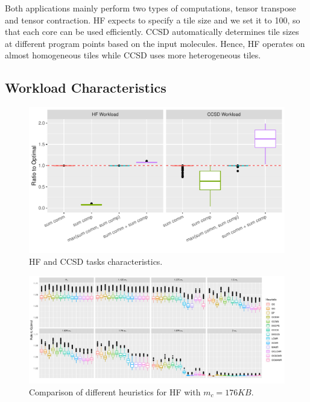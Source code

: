 \documentclass[sigconf]{acmart}
\begin{document}
{		%
		Both applications mainly perform two types of computations, tensor transpose and tensor contraction. HF expects to specify a tile size and we set it to 100, so that each core can be used efficiently. CCSD automatically determines tile sizes at different program points based on the input molecules. Hence, HF operates on almost homogeneous tiles while CCSD uses more heterogeneous tiles.
		
		\subsection{Workload Characteristics}
		\begin{figure}[htb]
			\vspace*{-0.3cm}
			\begin{center}
				\includegraphics[scale=0.48]{./results/application_properties.pdf}
				\vspace*{-0.9cm}\caption{HF and CCSD tasks characteristics.\vspace*{-0.35cm}}
				\label{fig:ApplicationProperties}
			\end{center}
		\end{figure}
			\begin{figure}[!t]
			\includegraphics[scale=0.5]{./results/ratio_to_optimal_selected_hf.pdf}
			\vspace*{-0.85cm}\caption{Comparison of different heuristics for HF with $m_c=176KB$.			\vspace*{-0.35cm}}
			\label{fig:ratio_to_optimal_hf}
		\end{figure}	


}
\end{document}
